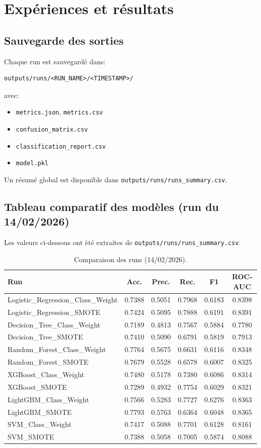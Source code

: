 \documentclass[11pt,a4paper]{article}
\begin{document}
\section{Exp\'eriences et r\'esultats}
\subsection{Sauvegarde des sorties}
Chaque run est sauvegard\'e dans:
\begin{verbatim}
outputs/runs/<RUN_NAME>/<TIMESTAMP>/
\end{verbatim}
avec:
\begin{itemize}
  \item \texttt{metrics.json}, \texttt{metrics.csv}
  \item \texttt{confusion\_matrix.csv}
  \item \texttt{classification\_report.csv}
  \item \texttt{model.pkl}
\end{itemize}

Un r\'esum\'e global est disponible dans \texttt{outputs/runs/runs\_summary.csv}.

\subsection{Tableau comparatif des mod\`eles (run du 14/02/2026)}
Les valeurs ci-dessous ont \`et\'e extraites de \texttt{outputs/runs/runs\_summary.csv}.

\begin{table}[H]
\centering
\small
\begin{tabular}{lccccc}
\toprule
\textbf{Run} & \textbf{Acc.} & \textbf{Prec.} & \textbf{Rec.} & \textbf{F1} & \textbf{ROC-AUC} \\
\midrule
Logistic\_Regression\_Class\_Weight & 0.7388 & 0.5051 & 0.7968 & 0.6183 & 0.8398 \\
Logistic\_Regression\_SMOTE & 0.7424 & 0.5095 & 0.7888 & 0.6191 & 0.8391 \\
Decision\_Tree\_Class\_Weight & 0.7189 & 0.4813 & 0.7567 & 0.5884 & 0.7780 \\
Decision\_Tree\_SMOTE & 0.7410 & 0.5090 & 0.6791 & 0.5819 & 0.7913 \\
Random\_Forest\_Class\_Weight & 0.7764 & 0.5675 & 0.6631 & 0.6116 & 0.8348 \\
Random\_Forest\_SMOTE & 0.7679 & 0.5528 & 0.6578 & 0.6007 & 0.8325 \\
XGBoost\_Class\_Weight & 0.7480 & 0.5178 & 0.7380 & 0.6086 & 0.8314 \\
XGBoost\_SMOTE & 0.7289 & 0.4932 & 0.7754 & 0.6029 & 0.8321 \\
LightGBM\_Class\_Weight & 0.7566 & 0.5283 & 0.7727 & 0.6276 & 0.8363 \\
LightGBM\_SMOTE & 0.7793 & 0.5763 & 0.6364 & 0.6048 & 0.8365 \\
SVM\_Class\_Weight & 0.7417 & 0.5088 & 0.7701 & 0.6128 & 0.8161 \\
SVM\_SMOTE & 0.7388 & 0.5058 & 0.7005 & 0.5874 & 0.8088 \\
\bottomrule
\end{tabular}
\caption{Comparaison des runs (14/02/2026).}
\end{table}
\end{document}
